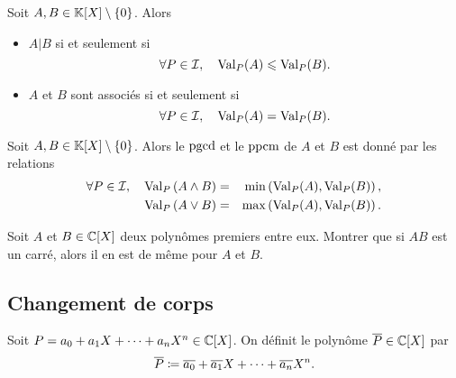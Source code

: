 \documentclass{magnolia}
\begin{document}
\begin{proposition}
Soit $A,B\in\polyK\setminus\ens{0}$. Alors
\begin{itemize}
\item $A|B$ si et seulement si
  \[\forall P\in\mathcal{I} ,\quad {\rm Val}_P(A)\leqslant {\rm Val}_P(B).\]
\item $A$ et $B$ sont associés si et seulement si
  \[\forall P\in\mathcal{I} ,\quad {\rm Val}_P(A)= {\rm Val}_P(B).\]
\end{itemize}
\end{proposition}

\begin{proposition}
Soit $A,B\in\polyK\setminus\ens{0}$. Alors le $\operatorname{pgcd}$ et le $\operatorname{ppcm}$ de $A$ et $B$ est donné par les relations
  \begin{eqnarray*}
  \forall P\in\mathcal{I} ,\quad {\rm Val}_P \left(A\wedge B\right)&=&\min\left({\rm Val}_P(A),{\rm Val}_P(B)\right),\\
  {\rm Val}_P \left(A\vee B\right)&=&\max\left({\rm Val}_P(A),{\rm Val}_P(B)\right).
  \end{eqnarray*}
\end{proposition}


\begin{exoUnique}
\exo Soit $A$ et $B\in\polyC$ deux polynômes premiers entre eux. Montrer
  que si $AB$ est un carré, alors il en est de même pour $A$ et $B$.
\end{exoUnique}

\subsection{Changement de corps}

\begin{definition}
Soit $P=a_0+a_1 X+\cdots+a_n X^n\in\polyC$. On définit le polynôme
$\conj{P}\in\polyC$ par
\[\overline{P}\coloneqq \overline{a_0}+\overline{a_1}X+\cdots+\overline{a_n}X^n.\]
\end{definition}
\end{document}
